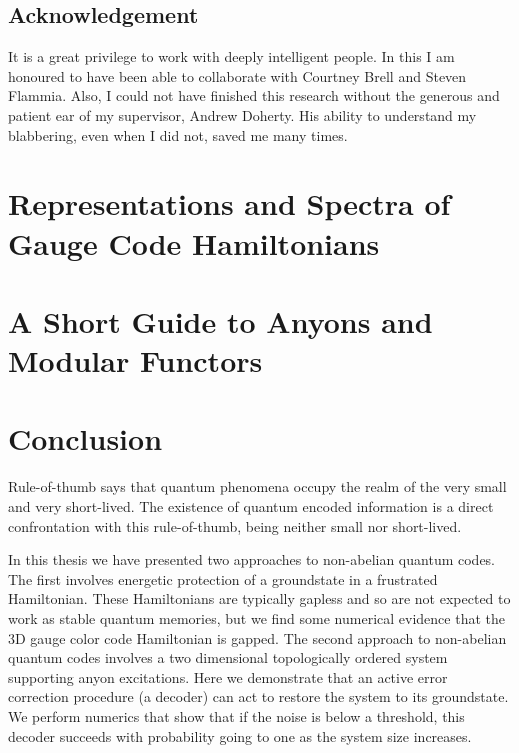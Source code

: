 \documentclass[11pt,oneside]{report}
\newcommand{\danbrowne}[1]{\ \textcolor{red}{\{#1\}}\ }
\begin{document}
\section{Acknowledgement}

It is a great privilege to work with deeply intelligent people.
In this I am honoured to have been able to collaborate with Courtney
Brell and Steven Flammia. Also, I could not have finished this
research without the generous and patient ear of my supervisor, Andrew Doherty.
His ability to understand my blabbering, even when I did not, saved me many times.


\chapter{Representations and Spectra of Gauge Code Hamiltonians}




\chapter{A Short Guide to Anyons and Modular Functors}






\chapter{Conclusion}


Rule-of-thumb says that quantum phenomena occupy 
the realm of the very small and very short-lived.
The existence of 
quantum encoded information is a direct confrontation with this rule-of-thumb,
being neither small nor short-lived.

In this thesis we have presented two approaches to
non-abelian quantum codes.
The first involves energetic protection of a groundstate
in a frustrated Hamiltonian.
These Hamiltonians are typically gapless and so are not
expected to work as stable quantum memories, but we find
some numerical evidence that the 3D gauge color code Hamiltonian
is gapped.
The second approach to non-abelian quantum codes involves
a two dimensional topologically ordered system supporting
anyon excitations.
Here we demonstrate that an active error correction
procedure (a decoder) can act to restore the
system to its groundstate.
We perform numerics that show that if the noise is below
a threshold, this decoder succeeds with probability going to
one as the system size increases.
\end{document}
